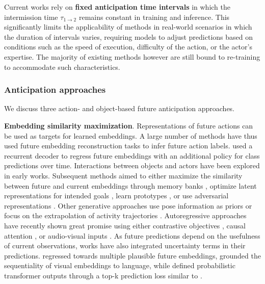 Current works rely on \textbf{fixed anticipation time intervals} in which the intermission time $\tau_{1 \rightarrow 2}$ remains constant in training and inference. This significantly limits the applicability of methods in real-world scenarios in which the duration of intervals varies, requiring models to adjust predictions based on conditions such as the speed of execution, difficulty of the action, or the actor's expertise. The majority of existing methods however are still bound to re-training to accommodate such characteristics. 



\subsubsection{Anticipation approaches}

We discuss three action- and object-based future anticipation approaches. 


\noindent
\textbf{Embedding similarity maximization}. Representations of future actions can be used as targets for learned embeddings. A large number of methods have thus used future embedding reconstruction tasks to infer future action labels. \citet{gao2017red} used a recurrent decoder to regress future embeddings with an additional policy for class predictions over time. Interactions between objects and actors \citep{sun2019relational,luc2018predicting} have been explored in early works. Subsequent methods aimed to either maximize the similarity between future and current embeddings through memory banks \citep{liu2022hybrid}, optimize latent representations for intended goals \citep{roy2022action}, learn prototypes \citep{diko2024semantically}, or use adversarial representations \citep{gammulle2019predicting}. Other generative approaches use pose information as priors \citep{villegas2017learning} or focus on the extrapolation of activity trajectories \citep{chi2023adamsformer}. Autoregressive approaches have recently shown great promise using either contrastive objectives \citep{wu2020learning}, causal attention \citep{girdhar2021anticipative}, or audio-visual inputs \citep{zhong2023anticipative}. As future predictions depend on the usefulness of current observations, works have also integrated uncertainty terms in their predictions. \citet{vondrick2016anticipating} regressed towards multiple plausible future embeddings, \citet{abdelsalam2023gepsan} grounded the sequentiality of visual embeddings to language, while \citet{guo2024uncertainty} defined probabilistic transformer outputs through a top-k prediction loss similar to \citet{furnari2018leveraging}.

